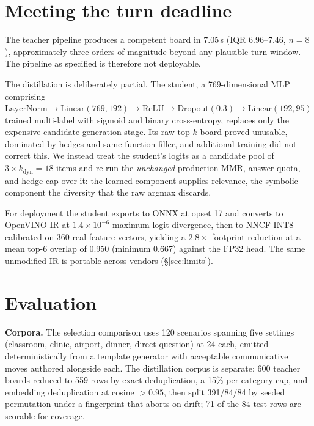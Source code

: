 \section{Meeting the turn deadline}

The teacher pipeline produces a competent board in 7.05\,s (IQR 6.96--7.46,
$n{=}8$), approximately three orders of magnitude beyond any plausible turn
window. The pipeline as specified is therefore not deployable.

The distillation is deliberately partial. The student, a 769-dimensional MLP
comprising $\mathrm{LayerNorm} \rightarrow \mathrm{Linear}(769,192) \rightarrow
\mathrm{ReLU} \rightarrow \mathrm{Dropout}(0.3) \rightarrow
\mathrm{Linear}(192,95)$ trained multi-label with sigmoid and binary
cross-entropy, replaces only the expensive candidate-generation stage. Its raw
top-$k$ board proved unusable, dominated by hedges and same-function filler, and
additional training did not correct this. We instead treat the student's logits
as a candidate pool of $3 \times k_{\mathrm{dyn}} = 18$ items and re-run the
\emph{unchanged} production MMR, answer quota, and hedge cap over it: the learned
component supplies relevance, the symbolic component the diversity that the raw
argmax discards.

For deployment the student exports to ONNX at opset 17 and converts to OpenVINO
IR at $1.4\times10^{-6}$ maximum logit divergence, then to NNCF INT8 calibrated
on 360 real feature vectors, yielding a $2.8\times$ footprint reduction at a mean
top-6 overlap of 0.950 (minimum 0.667) against the FP32 head. The same unmodified
IR is portable across vendors (\S\ref{sec:limits}).

\section{Evaluation}\label{sec:eval}

\textbf{Corpora.} The selection comparison uses 120 scenarios spanning five
settings (classroom, clinic, airport, dinner, direct question) at 24 each,
emitted deterministically from a template generator with acceptable communicative
moves authored alongside each. The distillation corpus is separate:
600 teacher boards reduced to 559 rows by exact deduplication, a 15\%
per-category cap, and embedding deduplication at cosine ${>}0.95$, then split
391/84/84 by seeded permutation under a fingerprint that aborts on drift; 71 of
the 84 test rows are scorable for coverage.

